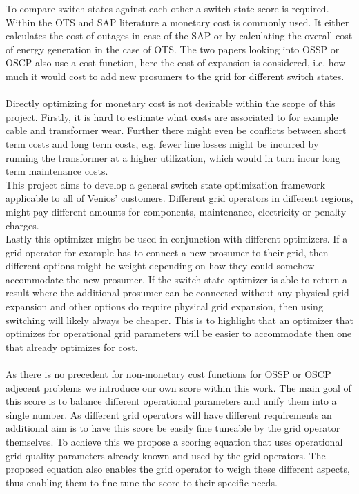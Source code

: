 To compare switch states against each other a switch state score is required. 
Within the OTS and SAP literature a monetary cost is commonly used. It either
calculates the cost of outages in case of the SAP\autocite{switch_allociation_lit_review}
or by calculating the overall cost
of energy generation in the case of OTS\autocite{ots_lit_review}. The two papers
looking into OSSP or OSCP also use a cost function, here the cost of expansion
is considered, i.e. how much it would cost to add new prosumers to the grid
for different switch states.\\
\\
Directly optimizing for monetary cost is not desirable within the scope of this
project. Firstly, it is hard to estimate what costs are associated
to for example cable and transformer wear. Further there might even
be conflicts between short term costs and long term costs, e.g.
fewer line losses might be incurred by running the transformer at
a higher utilization, which would in turn incur long term maintenance costs.\\
This project aims to develop a general switch state optimization framework
applicable to all of Venios' customers. Different grid operators
in different regions, might pay different amounts for components, maintenance, electricity
or penalty charges.\\
Lastly this optimizer might be used in conjunction with different optimizers.
If a grid operator for example has to connect a new prosumer to their grid,
then different options might be weight depending on how they could somehow
accommodate the new prosumer. If the switch state optimizer is able
to return a result where the additional prosumer can be connected without
any physical grid expansion and other options do require physical grid expansion, then
using switching will likely always be cheaper\autocite{venios}. 
This is to highlight that an optimizer that optimizes for operational
grid parameters will be easier to accommodate then one that already optimizes
for cost.\\
\\
As there is no precedent for non-monetary cost functions for OSSP or OSCP adjecent
problems we introduce our own score within this work. The main goal of this score
is to balance different operational parameters and unify them into a single number.
As different grid operators will have different requirements an additional aim
is to have this score be easily fine tuneable by the grid operator themselves.
To achieve this we propose a scoring equation
that uses operational grid quality parameters already known and
used by the grid operators. The proposed equation also enables 
the grid operator to weigh these different aspects, thus enabling them to fine
tune the score to their specific needs.\\
